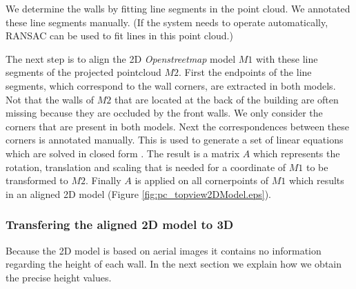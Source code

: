 We determine the walls by fitting line segments in the point cloud.  We
annotated these line segments manually.  (If the system needs to operate
automatically, RANSAC can be used to fit lines in this point cloud.)

\clearpage

The next step is to align the 2D \emph{Openstreetmap} model $M1$ with these line segments of the
projected pointcloud $M2$.  First the endpoints of the line segments, which
correspond to the wall corners, are extracted in both models.
Not that the walls of $M2$ that are located at the back of the building are often missing
because they are occluded by the front walls. We only consider the corners that
are present in both models.
Next the correspondences between these corners is annotated manually. 
This is used to generate a set of linear equations
which are solved in closed form \cite{hartley}. The result is a matrix $A$
which represents the rotation, translation and scaling that is needed for a
coordinate of $M1$ to be transformed to $M2$.
Finally $A$ is applied on all cornerpoints of $M1$ which results in an aligned 2D
model (Figure \ref{fig:pc_topview2DModel.eps}).








\subsubsection{Transfering the aligned 2D model to 3D}
Because the 2D model is based on aerial images it contains no
information regarding the height of each wall. 
In the next section we explain how we obtain the precise height values.\\

